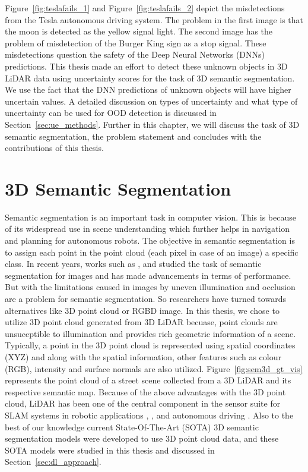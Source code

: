 Figure~\ref{fig:teslafails_1} and Figure~\ref{fig:teslafails_2} depict the misdetections from the Tesla autonomous driving system.
The problem in the first image is that the moon is detected as the yellow signal light.
The second image has the problem of misdetection of the Burger King sign as a stop signal. 
These misdetections question the safety of the Deep Neural Networks (DNNs) predictions.
This thesis made an effort to detect these unknown objects in 3D LiDAR data using uncertainty scores for the task of 3D semantic segmentation.
We use the fact that the DNN predictions of unknown objects will have higher uncertain values.
A detailed discussion on types of uncertainty and what type of uncertainty can be used for OOD detection is discussed in Section~\ref{sec:ue_methods}.
Further in this chapter, we will discuss the task of 3D semantic segmentation, the problem statement and concludes with the contributions of this thesis.

\section{3D Semantic Segmentation}
Semantic segmentation is an important task in computer vision.
This is because of its widespread use in scene understanding which further helps in navigation and planning for autonomous robots.
The objective in semantic segmentation is to assign each point in the point cloud (each pixel in case of an image) a specific class.
In recent years, works such as \cite{spatialpyramidpool}, \cite{deeplabv3} and \cite{fcn} studied the task of semantic segmentation for images and has made advancements in terms of performance.
But with the limitations caused in images by uneven illumination and occlusion are a problem for semantic segmentation.
So researchers have turned towards alternatives like 3D point cloud or RGBD image.
In this thesis, we chose to utilize 3D point cloud generated from 3D LiDAR becuase, point clouds are unsuceptible to illumination and provides rich geometric information of a scene.
Typically, a point in the 3D point cloud is represented using spatial coordinates (XYZ) and along with the spatial information, other features such as colour (RGB), intensity and surface normals are also utilized.
Figure~\ref{fig:sem3d_gt_vis} represents the point cloud of a street scene collected from a 3D LiDAR and its respective semantic map.
Because of the above advantages with the 3D point cloud, LiDAR has been one of the central component in the sensor suite for SLAM systems in robotic applications \cite{thrun2006stanley}, \cite{patz2008practical}, \cite{hess20162dSLAM} and autonomous driving \cite{li2016vehicle}.
Also to the best of our knowledge current State-Of-The-Art (SOTA) 3D semantic segmentation models were developed to use 3D point cloud data, and these SOTA models were studied in this thesis and discussed in Section~\ref{sec:dl_approach}.

